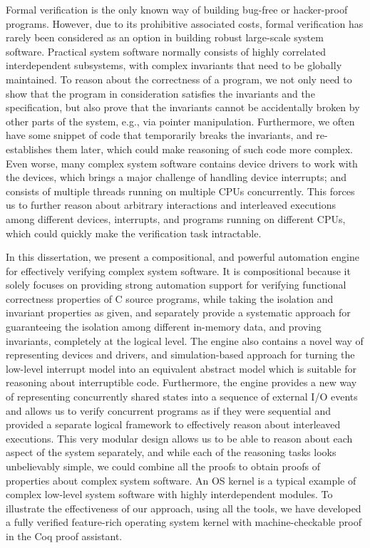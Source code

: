 Formal verification is the only known way of building bug-free or hacker-proof
programs. However, due to its prohibitive associated costs, formal verification
has rarely been considered as an option in building robust large-scale system software.
Practical system software normally consists of highly correlated interdependent subsystems,
with complex invariants that need to be globally maintained. To reason about the correctness of
a program, we not only need to show that the program in consideration
satisfies the invariants and the specification, but also prove that the invariants cannot be
accidentally broken by other parts of the system, e.g., via pointer manipulation.
Furthermore, we often have some snippet of code that temporarily breaks the invariants,
and re-establishes them later, which could make reasoning of such code more complex.
Even worse, many complex system software contains device drivers to work with the devices,
which brings a major challenge of handling device interrupts;
and consists of multiple threads running on multiple CPUs concurrently. 
This forces us to further reason about arbitrary interactions and interleaved executions among
different devices, interrupts, and programs running on different CPUs, which could quickly make the verification
task intractable.

In this dissertation, we present a compositional, and powerful automation engine for effectively
verifying complex system software. It is compositional because it solely focuses on providing strong automation
support for verifying functional correctness properties of C source programs, while taking the
isolation and invariant properties as given, and separately provide a systematic approach
for guaranteeing the isolation among different in-memory data, and proving invariants, completely
at the logical level. The engine also contains a novel way of representing devices and drivers, and
simulation-based approach for turning the low-level interrupt model into an equivalent abstract model which is
suitable for reasoning about interruptible code. Furthermore, the engine provides a new way of representing
concurrently shared states into a sequence of external I/O events and allows us to verify 
concurrent programs as if they were sequential and provided a separate logical framework to effectively
reason about interleaved executions. This very modular design allows us to be able to reason about each
aspect of the system separately, and while each of the reasoning tasks looks unbelievably simple, we could combine
all the proofs to obtain proofs of properties about complex system software.
An OS kernel is a typical example of complex low-level system software with highly interdependent modules.
To illustrate the effectiveness of our approach, using all the tools, we have developed a fully verified feature-rich
operating system kernel with machine-checkable proof in the Coq proof assistant.



